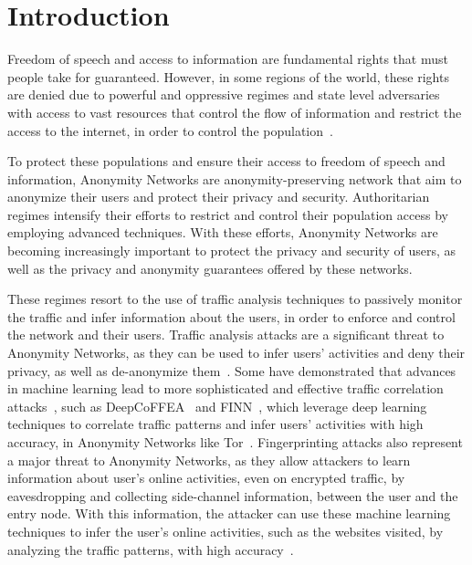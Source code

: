 
%

\chapter{Introduction}\label{cha:introduction}

Freedom of speech and access to information are fundamental rights that must people take for guaranteed. However, in some regions of the world, these rights are denied due to powerful and oppressive regimes and state level adversaries with access to vast resources that control the flow of information and restrict the access to the internet, in order to control the population~\cite*{aryan2013internet, zittrain2017shifting, alimardani2018internet}. 

To protect these populations and ensure their access to freedom of speech and information, Anonymity Networks are anonymity-preserving network that aim to anonymize their users and protect their privacy and security. 
Authoritarian regimes intensify their efforts to restrict and control their population access by employing advanced techniques. 
With these efforts, Anonymity Networks are becoming increasingly important to protect the privacy and security of users, as well as the privacy and anonymity guarantees offered by these networks.

These regimes resort to the use of traffic analysis techniques to passively monitor the traffic and infer information about the users, in order to enforce and control the network and their users. 
Traffic analysis attacks are a significant threat to Anonymity Networks, as they can be used to infer users' activities and deny their privacy, as well as de-anonymize them~\cite*{chakravarty2014trafficanalysis, winter2012great, robjansen2019dosontor}.
Some have demonstrated that advances in machine learning lead to more sophisticated and effective traffic correlation attacks~\cite*{DeepCorr, TorMarker, TirDeanon}, such as DeepCoFFEA~\cite{DeepCoFFEA} and FINN~\cite{FINN}, which leverage deep learning techniques to correlate traffic patterns and infer users' activities with high accuracy, in Anonymity Networks like Tor~\cite{johnson2013users}.
Fingerprinting attacks also represent a major threat to Anonymity Networks, as they allow attackers to learn information about user's online activities, even on encrypted traffic, by eavesdropping and collecting side-channel information, between the user and the entry node. 
With this information, the attacker can use these machine learning techniques to infer the user's online activities, such as the websites visited, by analyzing the traffic patterns, with high accuracy~\cite*{DeepFingerprinting, TikTok, OnlineWebFingerprinting}.

